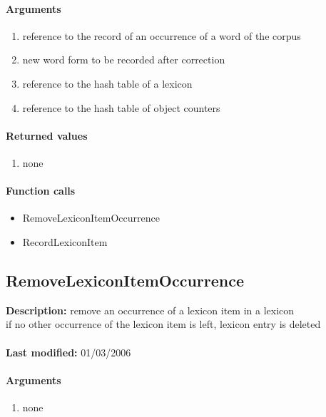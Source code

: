 \paragraph{Arguments}
\begin{enumerate}
\item reference to the record of an occurrence of a word of the corpus
\item new word form to be recorded after correction
\item reference to the hash table of a lexicon
\item reference to the hash table of object counters
\end{enumerate}

\paragraph{Returned values}
\begin{enumerate}
\item none
\end{enumerate}

\paragraph{Function calls}
\begin{itemize}
\item RemoveLexiconItemOccurrence
\item RecordLexiconItem
\end{itemize}

\subsection{RemoveLexiconItemOccurrence}
\textbf{Description:} remove an occurrence of a lexicon item in a lexicon\\
if no other occurrence of the lexicon item is left, lexicon entry is deleted\\
\\\textbf{Last modified:} 01/03/2006

\paragraph{Arguments}
\begin{enumerate}
\item none
\end{enumerate}

